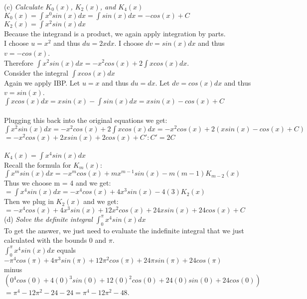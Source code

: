 \documentclass[11pt, oneside]{article}   	%
\begin{document}
\noindent (c) \textit{ Calculate $K_0(x)$, $K_2(x)$, and $K_4(x)$}\\
$K_0(x) = \int x^0 sin(x)dx = \int sin(x)dx = -cos(x) + C$\\
$K_2(x) = \int x^2sin(x)dx$\\
Because the integrand is a product, we again apply integration by parts.\\
I choose $u = x^2$ and thus $du = 2xdx$. I choose $dv = sin(x)dx$ and thus $v = -cos(x)$.\\
Therefore $\int x^2 sin(x)dx = -x^2cos(x) + 2 \int xcos(x)dx$.\\
Consider the integral $\int xcos(x)dx$\\
Again we apply IBP. Let $u = x$ and thus $du = dx$. Let $dv = cos(x)dx$ and thus $v = sin(x)$.\\
$\int xcos(x)dx = xsin(x) - \int sin(x)dx = xsin(x) - cos(x) + C$\\~\\
Plugging this back into the original equations we get:\\
$\int x^2 sin(x)dx = -x^2cos(x) + 2 \int xcos(x)dx = -x^2cos(x) + 2(xsin(x) - cos(x) + C)$\\
$= -x^2cos(x) + 2xsin(x) + 2cos(x) + C': C' = 2C$\\~\\
$K_4(x) = \int x^4 sin(x)dx$\\
Recall the formula for $K_m(x)$:\\
$\int x^msin(x)dx = -x^mcos(x) + mx^{m-1}sin(x)-m(m-1) K_{m-2}(x)$\\
Thus we choose m = 4 and we get:\\
$= \int x^4sin(x)dx = -x^4cos(x) + 4x^3 sin(x) - 4(3)K_2(x)$\\
Then we plug in $K_2(x)$ and we get:\\
$= -x^4cos(x) + 4x^3sin(x) + 12x^2cos(x) + 24xsin(x) + 24cos(x) + C$\\

\noindent(d) \textit{Solve the definite integral $\int_0^\pi x^4 sin(x)dx$}\\
To get the answer, we just need to evaluate the indefinite integral that we just calculated with the bounds 0 and $\pi$. \\
$\int_0^\pi x^4 sin(x)dx$ equals\\
$-\pi^4cos(\pi) + 4\pi^3sin(\pi) + 12\pi^2cos(\pi) + 24\pi sin(\pi) + 24cos(\pi)$\\
minus $(0^4cos(0) + 4(0)^3sin(0) + 12(0)^2cos(0) + 24(0) sin(0) + 24cos(0))$\\
$= \pi^4 - 12\pi^2 - 24 - 24 = \pi^4 - 12\pi^2 - 48$.\\
\end{document}
